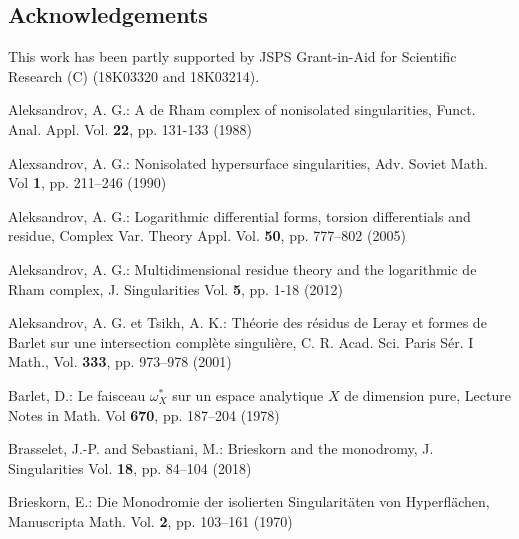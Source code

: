 \documentclass[pdftex]{arxsigma}
\begin{document}
\subsection*{Acknowledgements}
This work has been partly supported by JSPS Grant-in-Aid for  Scientific Research (C) (18K03320 and 18K03214).



%
%

\begin{thebibliography}{99}
\footnotesize\itemsep=0pt
\providecommand{\eprint}[2][]{\href{http://arxiv.org/abs/#2}{arXiv:#2}}



Aleksandrov, A. G.:
\newblock A de Rham complex of nonisolated singularities, 
\newblock Funct. Anal. Appl. 
Vol. {\bf 22}, pp. 131-133 (1988)



Alexsandrov, A. G.:
\newblock Nonisolated hypersurface singularities, 
\newblock Adv. Soviet Math.
Vol {\bf 1}, pp. 211--246 (1990)

Aleksandrov, A. G.: 
\newblock Logarithmic differential forms, torsion differentials and residue,
\newblock Complex Var. Theory Appl. 
Vol. {\bf 50}, pp. 777--802 (2005)

Aleksandrov, A. G.:
\newblock Multidimensional residue theory and the logarithmic de Rham complex, 
\newblock J. Singularities
Vol. {\bf 5}, pp. 1-18 (2012)

Aleksandrov, A. G. et Tsikh, A. K.: 
\newblock Th\'eorie des r\'esidus de Leray et formes de Barlet sur une intersection compl\`ete singuli\`ere, 
\newblock C. R. Acad. Sci. Paris S\'er. I Math., 
Vol. {\bf 333}, pp. 973--978 (2001)


Barlet, D.: 
\newblock Le faisceau $ \omega_X^{*}$ sur un espace analytique $X$ de dimension pure, 
\newblock Lecture Notes in Math.
Vol {\bf 670}, pp. 187--204 (1978)

Brasselet, J.-P. and Sebastiani, M.:
\newblock Brieskorn and the monodromy,
\newblock J. Singularities
Vol. {\bf 18}, pp. 84--104 (2018)


Brieskorn, E.:
\newblock Die Monodromie der isolierten Singularit\"aten von Hyperfl\"achen, 
\newblock Manuscripta Math. 
Vol. {\bf 2}, pp. 103--161 (1970)


\end{thebibliography}
\end{document}

